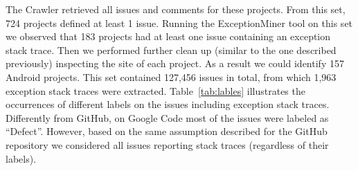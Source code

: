 The Crawler retrieved all issues and comments for these projects.
From this set, 724 projects defined at least 1 issue. Running the ExceptionMiner tool 
 on this set we observed that 183 projects had at least one issue containing an exception stack trace.
 Then we performed further clean up (similar to the one described previously) inspecting the site 
of each project. As a result we could identify 157 Android projects.  This set contained  127,456 issues in total,
 from which 1,963 exception stack traces were extracted. Table~\ref{tab:lables} illustrates the occurrences of different labels 
on the issues including exception stack traces. Differently from GitHub, on Google Code most of 
the issues were labeled as ``Defect''. However, based on the same assumption described for the GitHub repository
 we considered all issues reporting stack traces (regardless of their labels).






